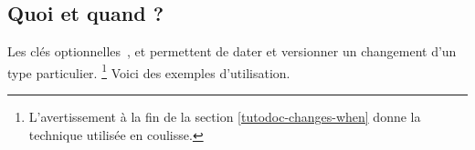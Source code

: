 \documentclass[10pt, a4paper]{../main/main}
\begin{document}
\subsection{Quoi et quand ?}

Les clés optionnelles \,,  et  permettent de dater et versionner un changement d'un type particulier.%
\footnote{
	L'avertissement à la fin de la section \ref{tutodoc-changes-when} donne la technique utilisée en coulisse.
}
Voici des exemples d'utilisation.

\end{document}
